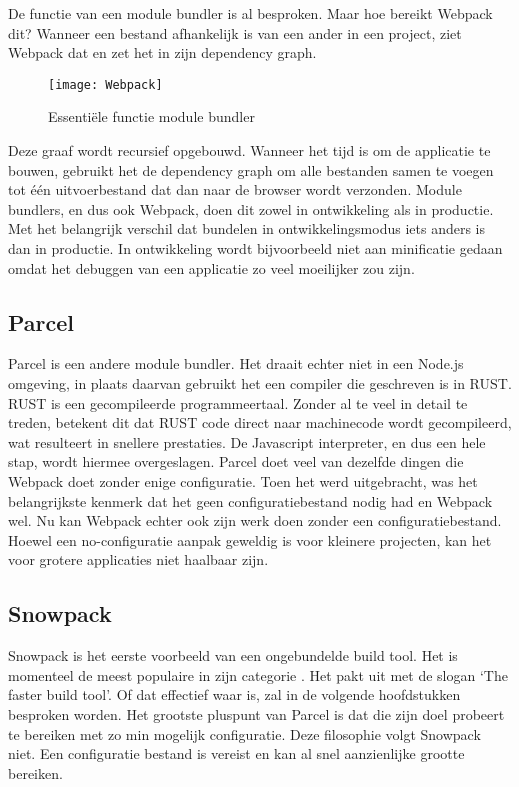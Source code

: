 De functie van een module bundler is al besproken. Maar hoe bereikt Webpack dit? Wanneer een bestand afhankelijk is van een ander in een project, ziet Webpack dat en zet het in zijn dependency graph.

\begin{figure}[h]
\texttt{[image: Webpack]}
   \caption{Essentiële functie module bundler \autocite{webpack-no-date}}
\end{figure}

Deze graaf wordt recursief opgebouwd. Wanneer het tijd is om de applicatie te bouwen, gebruikt het de dependency graph om alle bestanden samen te voegen tot één uitvoerbestand dat dan naar de browser wordt verzonden. Module bundlers, en dus ook Webpack, doen dit zowel in ontwikkeling als in productie. Met het belangrijk verschil dat bundelen in ontwikkelingsmodus iets anders is dan in productie. In ontwikkeling wordt bijvoorbeeld niet aan minificatie gedaan omdat het debuggen van een applicatie zo veel moeilijker zou zijn.

\subsection{Parcel}

Parcel \autocite{parcel-2020} is een andere module bundler. Het draait echter niet in een Node.js omgeving, in plaats daarvan gebruikt het een compiler die geschreven is in RUST. RUST is een gecompileerde programmeertaal. Zonder al te veel in detail te treden, betekent dit dat RUST code direct naar machinecode wordt gecompileerd, wat resulteert in snellere prestaties. De Javascript interpreter, en dus een hele stap, wordt hiermee overgeslagen. Parcel doet veel van dezelfde dingen die Webpack doet zonder enige configuratie. Toen het werd uitgebracht, was het belangrijkste kenmerk dat het geen configuratiebestand nodig had en Webpack wel. Nu kan Webpack echter ook zijn werk doen zonder een configuratiebestand. Hoewel een no-configuratie aanpak geweldig is voor kleinere projecten, kan het voor grotere applicaties niet haalbaar zijn.

\subsection{Snowpack}

Snowpack \autocite{snowpack-2019} is het eerste voorbeeld van een ongebundelde build tool. Het is momenteel de meest populaire in zijn categorie \autocite{stateofjs-2020}. Het pakt uit met de slogan ‘The faster build tool’. Of dat effectief waar is, zal in de volgende hoofdstukken besproken worden. Het grootste pluspunt van Parcel is dat die zijn doel probeert te bereiken met zo min mogelijk configuratie. Deze filosophie volgt Snowpack niet. Een configuratie bestand is vereist en kan al snel aanzienlijke grootte bereiken.

